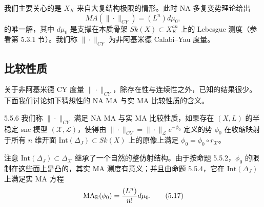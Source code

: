 
我们主要关心的是 $X_K$ 来自大复结构极限的情形。此时 NA 多复变势理论给出
\begin{equation}
MA(\|\cdot\|_{CY})=(L^n)d\mu_0, \tag{5.16}
\end{equation}
的唯一解，其中 $d\mu_0$ 是支撑在本质骨架 $Sk(X)\subset X_K^{an}$ 上的 Lebesgue 测度（参看第 5.3.1 节）。我们称 $\|\cdot\|_{CY}$ 为非阿基米德 Calabi--Yau 度量。


\subsection{比较性质}
关于非阿基米德 CY 度量 $\|\cdot\|_{CY}$，除存在性与连续性之外，已知的结果很少。下面我们讨论如下猜想性的 NA MA 与实 MA 比较性质的含义。

\begin{definition}{5.5.6}
我们称 $\|\cdot\|_{CY}$ 满足 NA MA 与实 MA 比较性质，如果存在 $(X,L)$ 的半稳定 snc 模型 $(\mathcal X,\mathcal L)$，使得由 $\|\cdot\|_{CY}=\|\cdot\|_{\mathcal L}e^{-\phi_0}$ 定义的势 $\phi_0$ 在收缩映射于所有 $n$ 维开面 $\mathrm{Int}(\Delta_J)\subset Sk(X)$ 上的原像上满足 $\phi_0=\phi_0\circ r_{\mathcal X}$。
\end{definition}

注意 $\mathrm{Int}(\Delta_J)\subset\Delta_{\mathcal X}$ 继承了一个自然的整仿射结构。由于按命题 5.5.2，$\phi_0$ 的限制在这些面上是凸的，其实 MA 测度有意义；并且由命题 5.5.4，它在 $\mathrm{Int}(\Delta_J)$ 上满足实 MA 方程
\begin{equation}
\mathrm{MA}_{\mathbb{R}}(\phi_0)=\frac{(L^n)}{n!}d\mu_0. \tag{5.17}
\end{equation}


